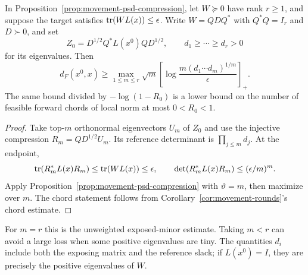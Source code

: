 \begin{theorem}\label{thm:movement-profile}
In Proposition~\ref{prop:movement-psd-compression}, let $W\succeq0$
have rank $r\geq1$, and suppose the target satisfies
$\operatorname{tr}(WL(x))\leq\epsilon$. Write $W=QDQ^*$ with $Q^*Q=I_r$ and
$D\succ0$, and set
\[
 Z_0=D^{1/2}Q^*L(x^0)QD^{1/2},\qquad
 d_1\geq\cdots\geq d_r>0
\]
for its eigenvalues. Then
\begin{equation}\label{eq:movement-profile}
 d_F(x^0,x)\geq
 \max_{1\leq m\leq r}\sqrt m
 \left[\log\frac{m(d_1\cdots d_m)^{1/m}}{\epsilon}\right]_+.
\end{equation}
The same bound divided by $-\log(1-R_0)$ is a lower bound on the
number of feasible forward chords of local norm at most $0<R_0<1$.
\end{theorem}
\begin{proof}
Take top-$m$ orthonormal eigenvectors $U_m$ of $Z_0$ and use the
injective compression $R_m=QD^{1/2}U_m$. Its reference determinant is
$\prod_{j\leq m}d_j$. At the endpoint,
\[
 \operatorname{tr}(R_m^*L(x)R_m)\leq\operatorname{tr}(WL(x))\leq\epsilon,
 \qquad
 \det(R_m^*L(x)R_m)\leq(\epsilon/m)^m.
\]
Apply Proposition~\ref{prop:movement-psd-compression} with
$\vartheta=m$, then maximize over $m$. The chord statement follows
from Corollary~\ref{cor:movement-rounds}'s chord estimate.
\end{proof}
For $m=r$ this is the unweighted exposed-minor estimate. Taking $m<r$
can avoid a large loss when some positive eigenvalues are tiny.
The quantities $d_i$ include both the exposing matrix and the reference
slack; if $L(x^0)=I$, they are precisely the positive eigenvalues of $W$.

